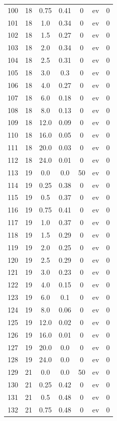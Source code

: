 \documentclass[12pt,a4paper]{article}
\begin{document}
\begin{tabular}{r|cccccc}
	100 & 18 & 0.75 & 0.41 & 0 & ev & 0 \\
	101 & 18 & 1.0 & 0.34 & 0 & ev & 0 \\
	102 & 18 & 1.5 & 0.27 & 0 & ev & 0 \\
	103 & 18 & 2.0 & 0.34 & 0 & ev & 0 \\
	104 & 18 & 2.5 & 0.31 & 0 & ev & 0 \\
	105 & 18 & 3.0 & 0.3 & 0 & ev & 0 \\
	106 & 18 & 4.0 & 0.27 & 0 & ev & 0 \\
	107 & 18 & 6.0 & 0.18 & 0 & ev & 0 \\
	108 & 18 & 8.0 & 0.13 & 0 & ev & 0 \\
	109 & 18 & 12.0 & 0.09 & 0 & ev & 0 \\
	110 & 18 & 16.0 & 0.05 & 0 & ev & 0 \\
	111 & 18 & 20.0 & 0.03 & 0 & ev & 0 \\
	112 & 18 & 24.0 & 0.01 & 0 & ev & 0 \\
	113 & 19 & 0.0 & 0.0 & 50 & ev & 0 \\
	114 & 19 & 0.25 & 0.38 & 0 & ev & 0 \\
	115 & 19 & 0.5 & 0.37 & 0 & ev & 0 \\
	116 & 19 & 0.75 & 0.41 & 0 & ev & 0 \\
	117 & 19 & 1.0 & 0.37 & 0 & ev & 0 \\
	118 & 19 & 1.5 & 0.29 & 0 & ev & 0 \\
	119 & 19 & 2.0 & 0.25 & 0 & ev & 0 \\
	120 & 19 & 2.5 & 0.29 & 0 & ev & 0 \\
	121 & 19 & 3.0 & 0.23 & 0 & ev & 0 \\
	122 & 19 & 4.0 & 0.15 & 0 & ev & 0 \\
	123 & 19 & 6.0 & 0.1 & 0 & ev & 0 \\
	124 & 19 & 8.0 & 0.06 & 0 & ev & 0 \\
	125 & 19 & 12.0 & 0.02 & 0 & ev & 0 \\
	126 & 19 & 16.0 & 0.01 & 0 & ev & 0 \\
	127 & 19 & 20.0 & 0.0 & 0 & ev & 0 \\
	128 & 19 & 24.0 & 0.0 & 0 & ev & 0 \\
	129 & 21 & 0.0 & 0.0 & 50 & ev & 0 \\
	130 & 21 & 0.25 & 0.42 & 0 & ev & 0 \\
	131 & 21 & 0.5 & 0.48 & 0 & ev & 0 \\
	132 & 21 & 0.75 & 0.48 & 0 & ev & 0 \\

\end{tabular}
\end{document}

